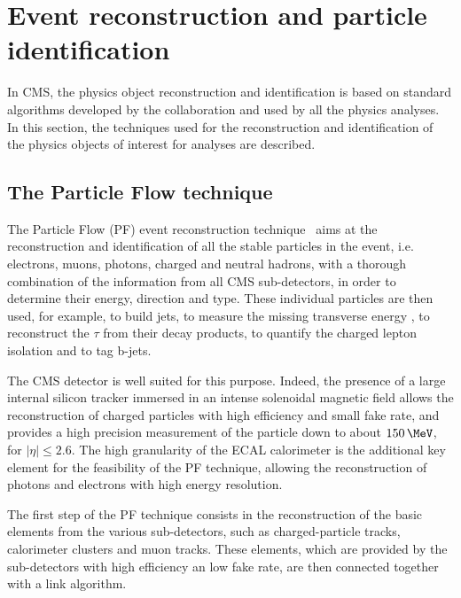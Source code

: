 \section{Event reconstruction and particle identification}
\label{sec:Objects}

In CMS, the physics object reconstruction and identification is based on standard algorithms developed by the collaboration and used by all the physics analyses. In this section, the techniques used for the reconstruction and identification of the physics objects of interest for \hwwllnn analyses are described.

\subsection{The Particle Flow technique}\label{sec:PF}

The Particle Flow (PF) event reconstruction technique~\cite{CMS-PAS-PFT-09-001} aims at the reconstruction and identification of all the stable particles in the event, i.e. electrons, muons, photons, charged and neutral hadrons, with a thorough combination of the information from all CMS sub-detectors, in order to determine their energy, direction and type. These individual particles are then used, for example, to build jets, to measure the missing transverse energy \MET, to reconstruct the $\tau$ from their decay products, to quantify the charged lepton isolation and to tag b-jets.

The CMS detector is well suited for this purpose. Indeed, the presence of a large internal silicon tracker immersed in an intense solenoidal magnetic field allows the reconstruction of charged particles with high efficiency and small fake rate, and provides a high precision measurement of the particle \pt down to about $150\,\MeV$, for $|\eta|\leq2.6$. The high granularity of the ECAL calorimeter is the additional key element for the feasibility of the PF technique, allowing the reconstruction of photons and electrons with high energy resolution.

The first step of the PF technique consists in the reconstruction of the basic elements from the various sub-detectors, such as charged-particle tracks, calorimeter clusters and muon tracks. These elements, which are provided by the sub-detectors with high efficiency an low fake rate, are then connected together with a link algorithm.

